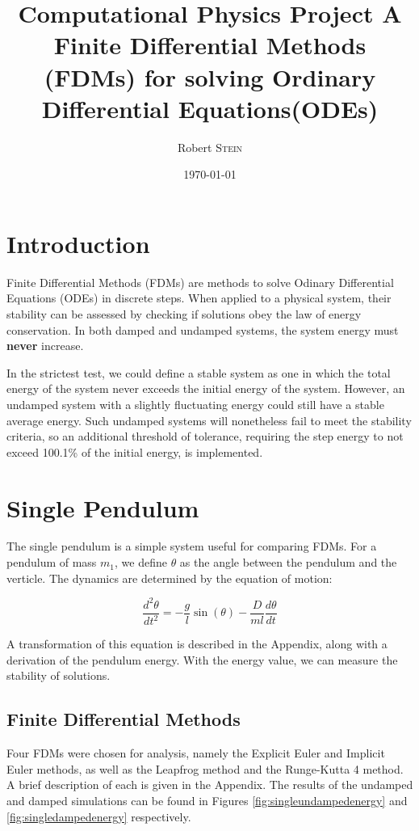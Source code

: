 \documentclass{article}
\title{Computational Physics Project A\\Finite Differential Methods (FDMs) for solving Ordinary Differential Equations(ODEs) } %
\author{Robert \textsc{Stein}} %
\date{\today} %
\begin{document}
\maketitle %
\section{Introduction}
Finite Differential Methods (FDMs) are methods to solve Odinary Differential Equations (ODEs) in discrete steps. When applied to a physical system, their stability can be assessed by checking if solutions obey the law of energy conservation. In both damped and undamped systems, the system energy must \textbf{never} increase. 

In the strictest test, we could define a stable system as one in which the total energy of the system never exceeds the initial energy of the system. However, an undamped system with a slightly fluctuating energy could still have a stable average energy. Such undamped systems will nonetheless fail to meet the stability criteria, so an additional threshold of tolerance, requiring the step energy to not exceed 100.1\% of the initial energy, is implemented.

\section{Single Pendulum}
The single pendulum is a simple system useful for comparing FDMs. For a pendulum of mass $m_{1}$, we define $\theta$ as the angle between the pendulum and the verticle. The dynamics are determined by the equation of motion:

\[ \frac{d^{2}\theta}{dt^{2}} = - \frac{g}{l} \sin(\theta) - \frac{D}{ml} \frac{d\theta}{dt} \]

A transformation of this equation is described in the Appendix, along with a derivation of the pendulum energy. With the energy value, we can measure the stability of solutions.
\subsection{Finite Differential Methods}
Four FDMs were chosen for analysis, namely the Explicit Euler and Implicit Euler methods, as well as the Leapfrog method and the Runge-Kutta 4 method. A brief description of each is given in the Appendix. The results of the undamped and damped simulations can be found in Figures \ref{fig:singleundampedenergy} and \ref{fig:singledampedenergy} respectively. 
\end{document}
